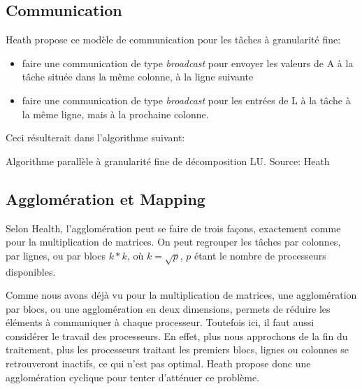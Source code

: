 \documentclass[12pt,letterpaper]{article} %
\begin{document}
\newpage
\subsection{Communication}

Heath propose ce modèle de communication pour les tâches à granularité fine\cite{parallel-lu}:
\begin{itemize}
   \item faire une communication de type \emph{broadcast} pour envoyer les valeurs de A à la tâche
    située dans la même colonne, à la ligne suivante
   \item faire une communication de type \emph{broadcast} pour les entrées de L à la tâche
    à la même ligne, mais à la prochaine colonne.
\end{itemize}

Ceci résulterait dans l'algorithme suivant:

\begin{algorithm}
\caption{Algorithme parallèle à granularité fine de décomposition LU. Source: Heath\cite{parallel-lu}}
\end{algorithm}

\subsection{Agglomération et Mapping}

Selon Health, l'agglomération peut se faire de trois façons, 
exactement comme pour la multiplication de matrices. On peut regrouper les tâches 
par colonnes, par lignes, ou par blocs $k*k$, où $k = \sqrt{p}$, $p$ étant 
le nombre de processeurs disponibles\cite{parallel-lu}.

Comme nous avons déjà vu pour la multiplication de matrices, une agglomération par blocs, ou
une agglomération en deux dimensions, permets de réduire les éléments à communiquer 
à chaque processeur. Toutefois ici, il faut aussi considérer le travail des processeurs. 
En effet, plus nous approchons de la fin du traitement, plus les processeurs traitant 
les premiers blocs, lignes ou colonnes se retrouveront inactifs, ce qui n'est pas optimal.
Heath propose donc une agglomération cyclique pour tenter d'atténuer ce problème.
\end{document}
